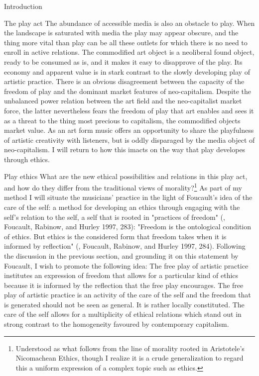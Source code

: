 \documentclass[presentation]{beamer}
\makeatletter
\newcommand{\cslcitation}[2]
 {\protect\hyper@linkstart{cite}{citeproc_bib_item_#1}#2\hyper@linkend}
\makeatother
\begin{document}
\begin{frame}[label={sec:org669441d}]{Introduction}
\begin{block}{The play act}
The abundance of accessible media is also an obstacle to play. When the landscape is saturated with media the play may appear obscure, and the thing more vital than play can be all these outlets for which there is no need to enroll in active relations. The commodified art object is a neoliberal found object, ready to be consumed as is, and it makes it easy to disapprove of the play. Its economy and apparent value is in stark contrast to the slowly developing play of artistic practice. There is an obvious disagreement between the capacity of the freedom of play and the dominant market features of neo-capitalism. Despite the unbalanced power relation between the art field and the neo-capitalist market force, the latter nevertheless fears the freedom of play that art enables and sees it as a threat to the thing most precious to capitalism, the commodified objects market value. As an art form music offers an opportunity to share the playfulness of artistic creativity with listeners, but is oddly disparaged by the media object of neo-capitalism. I will return to how this imacts on the way that play developes through ethics.
\end{block}
\begin{block}{Play ethics}
What are the new ethical possibilities and relations in this play act, and how do they differ from the traditional views of morality?\footnote{Understood as what follows from the line of morality rooted in Aristotele's  Nicomachean Ethics, though I realize it is a crude generalization to regard this a uniform expression of a complex topic such as ethics.} As part of my method I will situate the musicians' practice in the light of Foucault's idea of the care of the self: a method for developing an ethics through engaging with the self's relation to the self, a self that is rooted in "practices of freedom" (, \cslcitation{6}{Foucault, Rabinow, and Hurley 1997, 283}): "Freedom is the ontological condition of ethics. But ethics is the considered form that freedom takes when it is informed by reflection" (, \cslcitation{6}{Foucault, Rabinow, and Hurley 1997, 284}). Following the discussion in the previous section, and grounding it on this statement by Foucault, I wish to promote the following idea: The free play of artistic practice institutes an expression of freedom that allows for a particular kind of ethics because it is informed by the reflection that the free play encourages. The free play of artistic practice is an activity of the care of the self and the freedom that is generated should not be seen as general. It  is rather locally constituted. The care of the self allows for a multiplicity of ethical relations which stand out in strong contrast to the homogeneity favoured by contemporary capitalism.


\end{block}
\end{frame}
\end{document}
